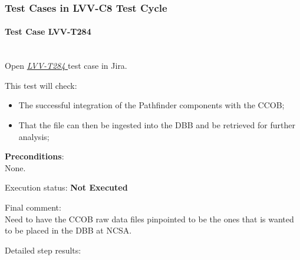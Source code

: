 \documentclass[DM,lsstdraft,STR,toc]{lsstdoc}
\providecommand{\tightlist}{
  \setlength{\itemsep}{0pt}\setlength{\parskip}{0pt}}
\begin{document}
  \subsubsection{Test Cases in LVV-C8 Test Cycle}


    \paragraph{Test Case LVV-T284 }\mbox{}\\

Open  \href{https://jira.lsstcorp.org/secure/Tests.jspa#/testCase/LVV-T284}{\textit{ LVV-T284 } }
test case in Jira.

    This test will check:

\begin{itemize}
\tightlist
\item
  The successful integration of the Pathfinder components with the CCOB;
\item
  That the file can then be ingested into the DBB and be retrieved for
  further analysis;
\end{itemize}


    {\bf Preconditions}:\\
    None.


    Execution status: {\bf Not Executed }

    Final comment:\\Need to have the CCOB raw data files pinpointed to be the ones that is
wanted to be placed in the DBB at NCSA.~~



    Detailed step results:
\end{document}
